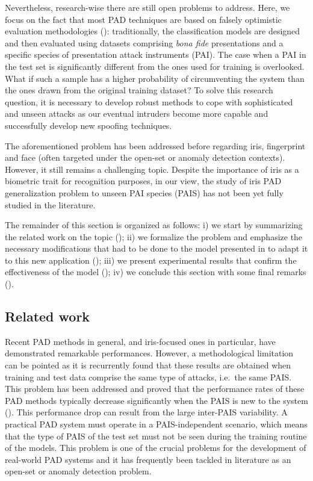Nevertheless, research-wise there are still open problems to address. Here, we focus on the fact that most PAD techniques are based on falsely optimistic evaluation methodologies (\citet{sequeira2016realistic}): traditionally, the classification models are designed and then evaluated using datasets comprising \emph{bona fide} presentations and a specific species of presentation attack instruments (PAI). The case when a PAI in the test set is significantly different from the ones used for training is overlooked. What if such a sample has a higher probability of circumventing the system than the ones drawn from the original training dataset? To solve this research question, it is necessary to develop robust methods to cope with sophisticated and unseen attacks as our eventual intruders become more capable and successfully develop new spoofing techniques.

The aforementioned problem has been addressed before regarding iris, fingerprint and face (often targeted under the open-set or anomaly detection contexts). However, it still remains a challenging topic. Despite the importance of iris as a biometric trait for recognition purposes, in our view, the study of iris PAD generalization problem to unseen PAI species (PAIS) has not been yet fully studied in the literature.

The remainder of this section is organized as follows: i) we start by summarizing the related work on the topic (); ii) we formalize the problem and emphasize the necessary modifications that had to be done to the model presented in  to adapt it to this new application (); iii) we present experimental results that confirm the effectiveness of the model (); iv) we conclude this section with some final remarks ().

\subsection{Related work}
\label{sec:adv_iris_attack_rel_work}

Recent PAD methods in general, and iris-focused ones in particular, have demonstrated remarkable performances. However, a methodological limitation can be pointed as it is recurrently found that these results are obtained when training and test data comprise the same type of attacks, i.e.\ the same PAIS. This problem has been addressed and proved that the performance rates of these PAD methods typically decrease significantly when the PAIS is new to the system (\citet{marasco2011robustness,bowyer2014cosmetic,sequeira2016realistic}). This performance drop can result from the large inter-PAIS variability. A practical PAD system must operate in a PAIS-independent scenario, which means that the type of PAIS of the test set must not be seen during the training routine of the models. This problem is one of the crucial problems for the development of real-world PAD systems and it has frequently been tackled in literature as an open-set or anomaly detection problem.

